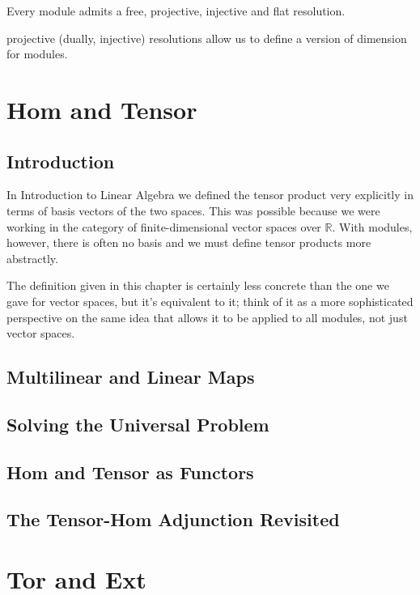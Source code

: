 \documentclass[oneside,english]{amsbook}
\numberwithin{section}{chapter}
\theoremstyle{plain}
\theoremstyle{definition}
\begin{document}
		Every module admits a free, projective, injective and flat resolution. 
		
		projective (dually, injective) resolutions allow us to define a version of dimension for modules. 

	\chapter{Hom and Tensor}
	
		\section{Introduction}

			In Introduction to Linear Algebra we defined the tensor product very explicitly in terms of basis vectors of the two spaces. This was possible because we were working in the category of finite-dimensional vector spaces over $\mathbb{R}$. With modules, however, there is often no basis and we must define tensor products more abstractly.
			
			The definition given in this chapter is certainly less concrete than the one we gave for vector spaces, but it's equivalent to it; think of it as a more sophisticated perspective on the same idea that allows it to be applied to all modules, not just vector spaces.
			
		\section{Multilinear and Linear Maps}
		
		\section{Solving the Universal Problem}

		\section{Hom and Tensor as Functors}

		\section{The Tensor-Hom Adjunction Revisited}


	\chapter{Tor and Ext}
		
\end{document}
